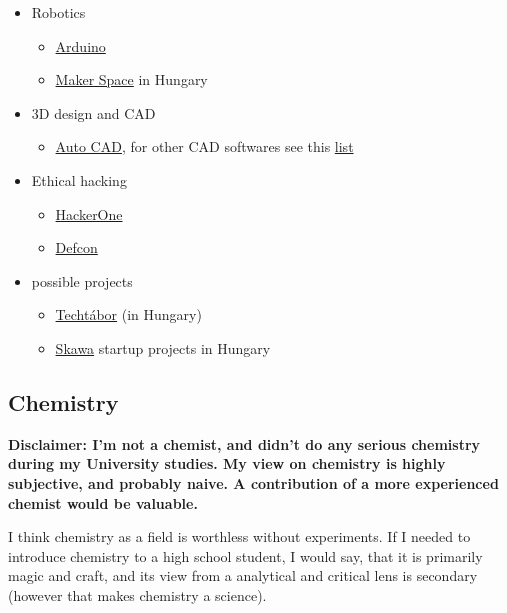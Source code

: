 \documentclass{article}
\begin{document}
\begin{itemize}
    \item Robotics
    \begin{itemize}
        \item \href{https://www.arduino.cc/}{Arduino}
        \item \href{https://www.makerspace.hu/}{Maker Space} in Hungary
    \end{itemize}
    
    \item 3D design and CAD
    \begin{itemize}
        \item \href{https://en.wikipedia.org/wiki/AutoCAD}{Auto CAD}, for other CAD softwares see this \href{https://all3dp.com/1/best-cad-software/}{list}
    \end{itemize}
    
    \item Ethical hacking
    \begin{itemize}
        \item \href{https://www.hackerone.com/}{HackerOne}
        \item \href{https://defcon.org/}{Defcon}
    \end{itemize}

    \item possible projects
    \begin{itemize}
        \item \href{https://techtabor.agondolkodasorome.hu/}{Techtábor} (in Hungary)
        \item \href{https://www.skawa.hu/}{Skawa} startup projects in Hungary
    \end{itemize}
\end{itemize}

\subsection{Chemistry}

\textbf{Disclaimer: I'm not a chemist, and didn't do any serious chemistry during my University studies. My view on chemistry is highly subjective, and probably naive. A contribution of a more experienced chemist would be valuable.}

I think chemistry as a field is worthless without experiments. If I needed to introduce chemistry to a high school student, I would say, that it is primarily magic and craft, and its view from a analytical and critical lens is secondary (however that makes chemistry a science).
\end{document}
